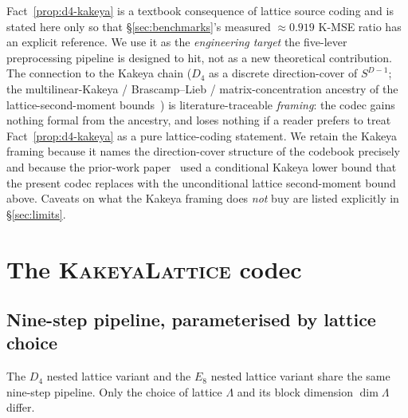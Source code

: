 \documentclass[10pt,a4paper]{article}
\theoremstyle{definition}
\theoremstyle{plain}
\begin{document}
Fact~\ref{prop:d4-kakeya} is a textbook consequence of lattice
source coding and is stated here only so that
\S\ref{sec:benchmarks}'s measured $\approx 0.919$ K-MSE ratio has
an explicit reference. We use it as the \emph{engineering target}
the five-lever preprocessing pipeline is designed to hit, not as
a new theoretical contribution. The connection to the Kakeya
chain ($D_4$ as a discrete direction-cover of $S^{D-1}$; the
multilinear-Kakeya / Brascamp--Lieb / matrix-concentration
ancestry of the lattice-second-moment
bounds~\cite{guth-endpoint,bennett-carbery-christ-tao,tropp-matrix-chernoff})
is literature-traceable \emph{framing}: the codec gains nothing
formal from the ancestry, and loses nothing if a reader prefers
to treat Fact~\ref{prop:d4-kakeya} as a pure lattice-coding
statement. We retain the Kakeya framing because it names the
direction-cover structure of the codebook precisely and because
the prior-work paper~\cite{kakeya-v13-paper} used a conditional
Kakeya lower bound that the present codec replaces with the
unconditional lattice second-moment bound above. Caveats on what
the Kakeya framing does \emph{not} buy are listed explicitly in
\S\ref{sec:limits}.

\section{The \textsc{KakeyaLattice} codec}
\label{sec:codec}

\subsection{Nine-step pipeline, parameterised by lattice choice}

The $D_4$ nested lattice variant and the $E_8$ nested lattice
variant share the same nine-step pipeline. Only the choice of
lattice $\Lambda$ and its block dimension $\dim\Lambda$ differ.
\end{document}
